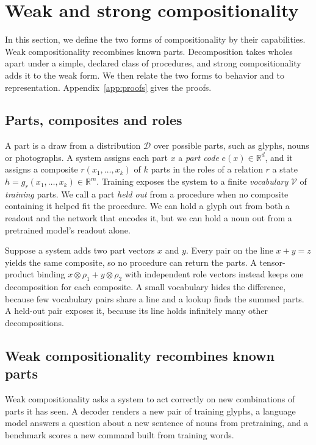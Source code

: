 \documentclass[10pt]{article}
\theoremstyle{plain}
\theoremstyle{remark}
\newcommand{\R}{\mathbb{R}}
\newcommand{\D}{\mathcal{D}}
\newcommand{\Voc}{\mathcal{V}}
\begin{document}
\section{Weak and strong compositionality}
\label{sec:definition}

In this section, we define the two forms of compositionality by their capabilities. Weak compositionality recombines known parts. Decomposition takes wholes apart under a simple, declared class of procedures, and strong compositionality adds it to the weak form. We then relate the two forms to behavior and to representation. Appendix~\ref{app:proofs} gives the proofs.

\subsection{Parts, composites and roles}
\label{sec:intuition}

A part is a draw from a distribution $\D$ over possible parts, such as glyphs, nouns or photographs. A system assigns each part $x$ a \emph{part code} $e(x) \in \R^d$, and it assigns a composite $r(x_1, \ldots, x_k)$ of $k$ parts in the roles of a relation $r$ a state $h = g_r(x_1, \ldots, x_k) \in \R^m$. Training exposes the system to a finite \emph{vocabulary} $\Voc$ of \emph{training} parts. We call a part \emph{held out} from a procedure when no composite containing it helped fit the procedure. We can hold a glyph out from both a readout and the network that encodes it, but we can hold a noun out from a pretrained model's readout alone.

Suppose a system adds two part vectors $x$ and $y$. Every pair on the line $x + y = z$ yields the same composite, so no procedure can return the parts. A tensor-product binding $x \otimes \rho_1 + y \otimes \rho_2$ with independent role vectors \citep{smolensky1990} instead keeps one decomposition for each composite. A small vocabulary hides the difference, because few vocabulary pairs share a line and a lookup finds the summed parts. A held-out pair exposes it, because its line holds infinitely many other decompositions.

\subsection{Weak compositionality recombines known parts}
\label{sec:notions}

Weak compositionality asks a system to act correctly on new combinations of parts it has seen. A decoder renders a new pair of training glyphs, a language model answers a question about a new sentence of nouns from pretraining, and a benchmark scores a new command built from training words.
\end{document}
